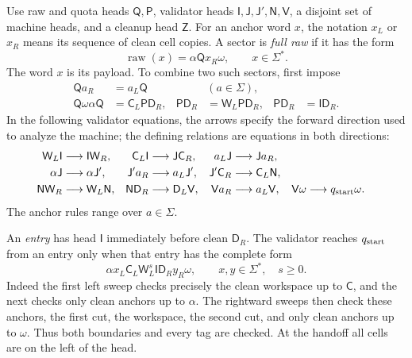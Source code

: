 Use raw and quota heads $\mathsf Q,\mathsf P$, validator heads
$\mathsf I,\mathsf J,\mathsf J',\mathsf N,\mathsf V$, a disjoint set of
machine heads, and a cleanup head $\mathsf Z$.
For an anchor word $x$, the notation $x_L$ or $x_R$ means its sequence
of clean cell copies. A sector is \emph{full raw} if it has the form
\[
\operatorname{raw}(x)=\alpha\mathsf Q x_R\omega,
\qquad x\in\Sigma^*.
\]
The word $x$ is its payload. To combine two such sectors, first impose
\begin{align}
\mathsf Q a_R&=a_L\mathsf Q &&(a\in\Sigma),\label{eq:compiler-slide}\\
\mathsf Q\omega\alpha\mathsf Q&=\mathsf C_L\mathsf P\mathsf D_R,
&\mathsf P\mathsf D_R&=\mathsf W_L\mathsf P\mathsf D_R,
&\mathsf P\mathsf D_R&=\mathsf I\mathsf D_R.
\label{eq:compiler-entry}
\end{align}
In the following validator equations, the arrows specify the forward
direction used to analyze the machine; the defining relations are
equations in both directions:
\begin{align}
\mathsf W_L\mathsf I&\longrightarrow\mathsf I\mathsf W_R,
&\mathsf C_L\mathsf I&\longrightarrow\mathsf J\mathsf C_R,
&a_L\mathsf J&\longrightarrow\mathsf J a_R,\nonumber\\
\alpha\mathsf J&\longrightarrow\alpha\mathsf J',
&\mathsf J'a_R&\longrightarrow a_L\mathsf J',
&\mathsf J'\mathsf C_R&\longrightarrow\mathsf C_L\mathsf N,
\label{eq:compiler-validation}\\
\mathsf N\mathsf W_R&\longrightarrow\mathsf W_L\mathsf N,
&\mathsf N\mathsf D_R&\longrightarrow\mathsf D_L\mathsf V,
&\mathsf V a_R&\longrightarrow a_L\mathsf V,
&\mathsf V\omega&\longrightarrow q_{\rm start}\omega.\nonumber
\end{align}
The anchor rules range over $a\in\Sigma$.

An \emph{entry} has head $\mathsf I$ immediately before clean
$\mathsf D_R$. The validator reaches $q_{\rm start}$ from an entry
only when that entry has the complete form
\begin{equation}\label{eq:compiler-clean-entry}
\alpha x_L\mathsf C_L\mathsf W_L^s\mathsf I\mathsf D_R y_R\omega,
\qquad x,y\in\Sigma^*,\quad s\geq0.
\end{equation}
Indeed the first left sweep checks precisely the clean workspace up to
$\mathsf C$, and the next checks only clean anchors up to $\alpha$.
The rightward sweeps then check these anchors, the first cut, the
workspace, the second cut, and only clean anchors up to $\omega$.
Thus both boundaries and every tag are checked. At the handoff all cells
are on the left of the head.

